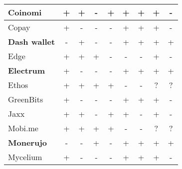 \begin{table*}
\begin{tabular}{ | l | c c c c | c | c | c | c | }
		\hline
		Coinomi & + & + & - & + & + & + & + & - \\
		\hline
		Copay & + & - & - & - & + & + & + & - \\
		\hline
		\textbf{Dash wallet} & - & + & - & - & + & + & + & + \\
		\hline
		Edge & + & + & + & - & - & - & + & - \\
		\hline
		\textbf{Electrum} & + & - & - & - & + & + & + & + \\
		\hline
		Ethos & + & + & + & + & - & - & ? & ? \\
		\hline
		GreenBits & + & - & - & - & + & + & + & - \\
		\hline
		Jaxx & + & + & - & + & + & - & + & - \\
		\hline
		Mobi.me & + & + & + & + & - & - & ? & ? \\
		\hline
		\textbf{Monerujo} & - & - & + & - & + & + & + & + \\
		\hline
		Mycelium & + & - & - & - & + & + & + & - \\

\end{tabular}
\end{table*}
